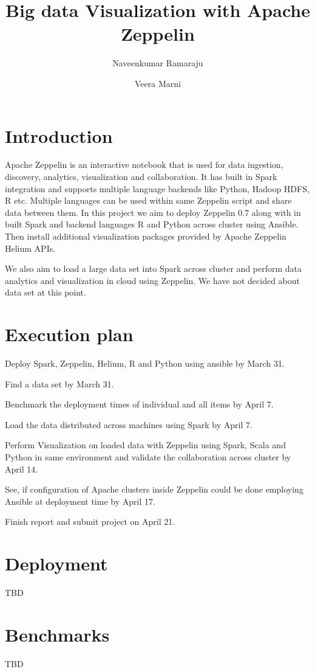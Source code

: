 \documentclass[9pt,twocolumn,twoside]{../../styles/osajnl}
\title{Big data Visualization with Apache Zeppelin}
\author[1, *]{Naveenkumar Ramaraju}
\author[1,*]{Veera Marni}
\affil[1]{School of Informatics and Computing, Bloomington, IN 47408, U.S.A.}
\affil[*]{Corresponding authors: naveenkumar2703@gmail.com, narayana1043@gmail.com}
\begin{document}
\maketitle

\section{Introduction}

Apache Zeppelin\cite{www-zeppelin}  is an interactive notebook that is used for data ingestion, discovery, analytics, visualization and collaboration. It has built in Spark integration and supports multiple language backends like Python, Hadoop HDFS, R etc.  Multiple languages can be used within same Zeppelin script and share data between them. In this project we aim to deploy Zeppelin 0.7 along with in built Spark and backend languages R and Python across cluster using Ansible. Then install additional  visualization packages provided by Apache Zeppelin Helium APIs. 

We also aim to load a large data set into Spark across cluster and perform data analytics and visualization in cloud using Zeppelin. We have not decided about data set at this point.

\section{Execution plan}

Deploy Spark, Zeppelin, Helium, R and Python using ansible by March 31.

Find a  data set by March 31.

Benchmark the deployment times of individual and all items by April 7.

Load the data distributed across machines using Spark by April 7.

Perform Visualization on loaded data with Zeppelin using Spark, Scala and Python in same environment and validate the collaboration across cluster by April 14.

See, if configuration of Apache clusters inside Zeppelin could be done employing Ansible at deployment time by April 17.

Finish report and submit project on April 21.


\section{Deployment}
TBD

\section{Benchmarks}
TBD
\end{document}
